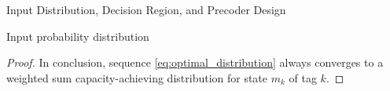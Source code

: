 \documentclass[journal]{IEEEtran}
\begin{document}
\begin{section}{Input Distribution, Decision Region, and Precoder Design}
\begin{subsection}{Input probability distribution}
\begin{proof}
				In conclusion, sequence \eqref{eq:optimal_distribution} always converges to a weighted sum capacity-achieving distribution for state $m_k$ of tag $k$.
			\end{proof}
		\end{subsection}




	\end{section}
	
	
\end{document}
